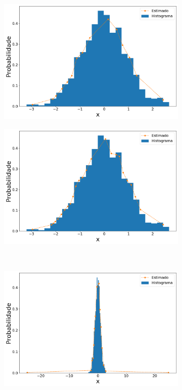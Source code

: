 \begin{figure}[H]
	\centering\begin{subfigure}[b]{0.45\textwidth}
		\centering 
		\includegraphics[width=\linewidth]{./figuras/iPDF1_normal_15_1_1000_0}
		\caption{}
		\label{fig:ipdf1_norm15_data}
	\end{subfigure}
	\hfill
	\begin{subfigure}[b]{0.45\textwidth}
		\centering 
		\includegraphics[width=\linewidth]{./figuras/iPDF1_normal_25_1_1000_0}
		\caption{}
		\label{fig:ipdf1_norm25_data}
	\end{subfigure}
	\\
	\begin{subfigure}[b]{0.45\textwidth}
		\centering 
		\includegraphics[width=\linewidth]{./figuras/iPDF1_normal_15_1_1000_25}

\end{subfigure}
\end{figure}
